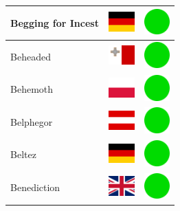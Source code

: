 \documentclass[12pt, a4paper, twoside]{report}
\begin{document}
\begin{center}
\begin{longtable}{|p{5cm}|p{2cm}|p{2cm}|}
 Begging for Incest                                         & \includegraphics[width=1cm]{../4x3/de} &   \includegraphics[width=1cm]{../likes/y} \\ \hline
 Beheaded                                                   & \includegraphics[width=1cm]{../4x3/mt} &   \includegraphics[width=1cm]{../likes/y} \\ \hline
 Behemoth                                                   & \includegraphics[width=1cm]{../4x3/pl} &   \includegraphics[width=1cm]{../likes/y} \\ \hline
 Belphegor                                                  & \includegraphics[width=1cm]{../4x3/at} &   \includegraphics[width=1cm]{../likes/y} \\ \hline
 Beltez                                                     & \includegraphics[width=1cm]{../4x3/de} &   \includegraphics[width=1cm]{../likes/y} \\ \hline
 Benediction                                                & \includegraphics[width=1cm]{../4x3/gb} &   \includegraphics[width=1cm]{../likes/y} \\ \hline

\end{longtable}
\end{center}
\end{document}
